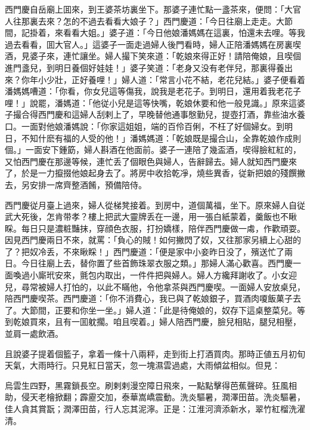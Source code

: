 西門慶自岳廟上囬來，到王婆茶坊裏坐下。那婆子連忙點一盞茶來，便問：「大官人往那裏去來？怎的不過去看看大娘子？」西門慶道：「今日往廟上走走。大節間，記掛着，來看看大姐。」婆子道：「今日他娘潘媽媽在這裏，怕還未去哩。等我過去看看，囬大官人。」這婆子一面走過婦人後門看時，婦人正陪潘媽媽在房裏喫酒，見婆子來，連忙讓坐。婦人撮下笑來道：「乾娘來得正好！請陪俺娘，且喫個進門盞兒，到明日養個好娃娃！」婆子笑道：「老身又没有老伴兒，那裏得養出來？你年小少壯，正好養哩！」婦人道：「常言小花不結，老花兒結。」婆子便看着潘媽媽嘈道：「你看，你女兒這等傷我，說我是老花子。到明日，還用着我老花子哩！」說罷，潘媽道：「他従小兒是這等快嘴，乾娘休要和他一般見識。」原來這婆子撮合得西門慶和這婦人刮剌上了，早晚替他通事慇勤兒，提壺打酒，靠些油水養口。一面對他娘潘媽說：「你家這姐姐，端的百伶百俐，不枉了好個婦女。到明日，不知什麽有福的人受的他！」潘媽媽道：「乾娘既是撮合山，全靠乾娘作成則個。」一面安下鍾筯，婦人斟酒在他面前。婆子一連陪了幾盃酒，喫得臉紅紅的，又怕西門慶在那邊等候，連忙丢了個眼色與婦人，告辭歸去。婦人就知西門慶來了，於是一力攛掇他娘起身去了。將房中收拾乾凈，燒些異香，従新把娘的殘饌撇去，另安排一席齊整酒餚，預備陪侍。

西門慶従月臺上過來，婦人從梯凳接着。到房中，道個萬福，坐下。原來婦人自従武大死後，怎肯带孝？樓上把武大靈牌丢在一邊，用一張白紙蒙着，羹飯也不瞅睬。每日只是濃粧豔抹，穿顔色衣服，打扮嬌樣，陪伴西門慶做一䖏，作歡頑耍。因見西門慶兩日不來，就罵：「負心的賊！如何撇閃了奴，又往那家另續上心甜的了？把奴冷丢，不來瞅睬！」西門慶道：「便是家中小妾昨日没了，殯送忙了兩日。今日往廟上去，替你置了些首飾珠翠衣服之類。」那婦人滿心歡喜。西門慶一面喚過小廝玳安來，氈包内取出，一件件把與婦人。婦人方纔拜謝收了。小女迎兒，尋常被婦人打怕的，以此不瞞他，令他拿茶與西門慶喫。一面婦人安放桌兒，陪西門慶喫茶。西門慶道：「你不消費心，我已與了乾娘銀子，買酒肉嗄飯菓子去了。大節間，正要和你坐一坐。」婦人道：「此是待俺娘的，奴存下這桌整菜兒。等到乾娘買來，且有一囬躭擱。咱且喫着。」婦人陪西門慶，臉兒相貼，腿兒相壓，並肩一處飲酒。

且說婆子提着個籃子，拿着一條十八兩秤，走到街上打酒買肉。那時正値五月初旬天氣，大雨時行。只見紅日當天，忽一塊濕雲過處，大雨傾盆相似。但見：
\begin{myquote}
烏雲生四野，黑霧鎖長空。刷剌剌漫空障日飛來，一點點擊得芭蕉聲碎。狂風相助，侵天老檜掀翻；霹靂交加，泰華嵩嶠震動。洗炎驅暑，潤澤田苗。洗炎驅暑，佳人貪其賞翫；潤澤田苗，行人忘其泥濘。正是：江淮河濟添新水，翠竹紅榴洗濯清。
\end{myquote}

